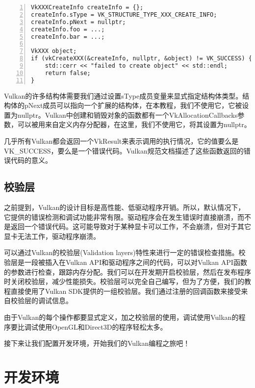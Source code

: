 \documentclass{ctexart}
\begin{document}
\begin{lstlisting}[language={[ANSI]C},keywordstyle=\color{blue!70},commentstyle=\color{red!50!green!50!blue!50},frame=shadowbox, rulesepcolor=\color{red!20!green!20!blue!20},basicstyle=\small,numbers=left, numberstyle=\tiny,breaklines = true]
VkXXXCreateInfo createInfo = {};
createInfo.sType = VK_STRUCTURE_TYPE_XXX_CREATE_INFO;
createInfo.pNext = nullptr;
createInfo.foo = ...;
createInfo.bar = ...;

VkXXX object;
if (vkCreateXXX(&createInfo, nullptr, &object) != VK_SUCCESS) {
	std::cerr << "failed to create object" << std::endl;
	return false;
}
\end{lstlisting}

Vulkan的许多结构体需要我们通过设置sType成员变量来显式指定结构体类型。结构体的pNext成员可以指向一个扩展的结构体，在本教程，我们不使用它，它被设置为nullptr。Vulkan中创建和销毁对象的函数都有一个VkAllocationCallbacks参数，可以被用来自定义内存分配器，在这里，我们不使用它，将其设置为nullptr。

几乎所有Vulkan都会返回一个VkResult来表示调用的执行情况，它的值要么是VK\_SUCCESS，要么是一个错误代码。Vulkan规范文档描述了这些函数返回的错误代码的意义。

\subsection{校验层}

之前提到，Vulkan的设计目标是高性能、低驱动程序开销。所以，默认情况下，它提供的错误检测和调试功能非常有限。驱动程序会在发生错误时直接崩溃，而不是返回一个错误代码。这可能导致对于某种显卡可以工作，不会崩溃，但对于其它显卡无法工作，驱动程序崩溃。

可以通过Vulkan的校验层(Validation layers)特性来进行一定的错误检查措施。校验层是一段被插入在Vulkan API和驱动程序之间的代码，可以对Vulkan API函数的参数进行检查，跟踪内存分配。我们可以在开发期开启校验层，然后在发布程序时关闭校验层，减少性能损失。校验层可以完全自己编写，但为了方便，我们的教程直接使用了Vulkan SDK提供的一组校验层。我们通过注册的回调函数来接受来自校验层的调试信息。

由于Vulkan的每个操作都要显式定义，加之校验层的使用，调试使用Vulkan的程序要比调试使用OpenGL和Direct3D的程序轻松太多。

接下来让我们配置开发环境，开始我们的Vulkan编程之旅吧！

\newpage
\section{开发环境}
\end{document}

